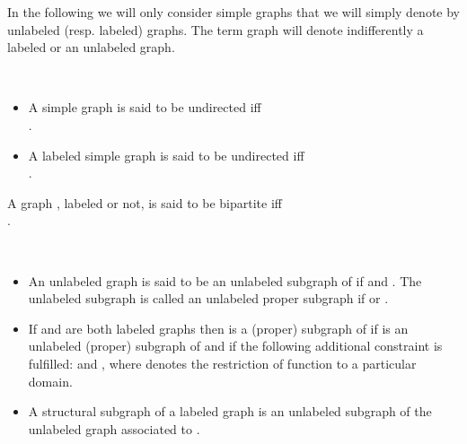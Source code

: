 In the following we will only consider simple graphs that we will
simply denote by unlabeled (resp. labeled) graphs.  The term graph
will denote indifferently a labeled or an unlabeled graph.
\begin{definition}\label{def:undirectedgraph}
~
\begin{itemize}
  \item A simple graph  is said to be undirected iff\\
  .
  \item A labeled simple graph  is said to be undirected iff\\
  .
\end{itemize}
\end{definition}
\begin{definition}\label{def:bipartitegraphs}
  A graph , labeled or not, is said to be bipartite
  iff \\ .
\end{definition}
\begin{definition}[Subgraph]\label{def:subgraph}
~
  \begin{itemize}
  \item An unlabeled graph  is said to be an unlabeled
    subgraph of  if  and
    . The unlabeled subgraph  is 
    called an unlabeled proper subgraph if  or .
  \item If  and 
    are both labeled graphs then  is a (proper) subgraph of 
    if
     is an unlabeled (proper) subgraph of 
    and if the
    following additional constraint is fulfilled:  and , where  denotes the restriction of function  to a
    particular domain.
  \item A structural subgraph of a labeled graph  is an unlabeled
    subgraph of the unlabeled graph associated to .
  \end{itemize}
\end{definition}












